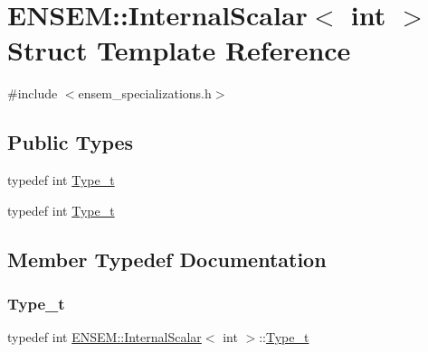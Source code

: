 \hypertarget{structENSEM_1_1InternalScalar_3_01int_01_4}{}\section{E\+N\+S\+EM\+:\+:Internal\+Scalar$<$ int $>$ Struct Template Reference}
\label{structENSEM_1_1InternalScalar_3_01int_01_4}


{\ttfamily \#include $<$ensem\+\_\+specializations.\+h$>$}

\subsection*{Public Types}
\begin{DoxyCompactItemize}
\item 
typedef int \mbox{\hyperlink{structENSEM_1_1InternalScalar_3_01int_01_4_a5814154ceb365d4ebbd319bcace78528}{Type\+\_\+t}}
\item 
typedef int \mbox{\hyperlink{structENSEM_1_1InternalScalar_3_01int_01_4_a5814154ceb365d4ebbd319bcace78528}{Type\+\_\+t}}
\end{DoxyCompactItemize}


\subsection{Member Typedef Documentation}
\mbox{\label{structENSEM_1_1InternalScalar_3_01int_01_4_a5814154ceb365d4ebbd319bcace78528}} 
\subsubsection{\texorpdfstring{Type\_t}{Type\_t}\hspace{0.1cm}{\footnotesize\ttfamily [1/2]}}
{\footnotesize\ttfamily typedef int \mbox{\hyperlink{structENSEM_1_1InternalScalar}{E\+N\+S\+E\+M\+::\+Internal\+Scalar}}$<$ int $>$\+::\mbox{\hyperlink{structENSEM_1_1InternalScalar_3_01int_01_4_a5814154ceb365d4ebbd319bcace78528}{Type\+\_\+t}}}

\mbox{\label{structENSEM_1_1InternalScalar_3_01int_01_4_a5814154ceb365d4ebbd319bcace78528}} 
